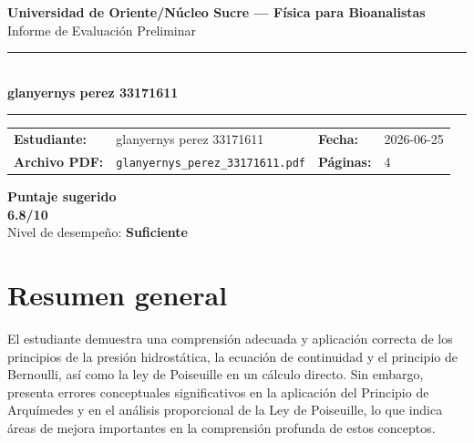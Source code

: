 \documentclass[11pt,a4paper]{article}
\begin{document}
\begin{center}
  {\Large\bfseries\color{azulTitulo} Universidad de Oriente/Núcleo Sucre --- Física para Bioanalistas}\\[4pt]
  {\large Informe de Evaluación Preliminar}\\[12pt]
  \rule{\linewidth}{1.2pt}\\[6pt]
  {\LARGE\bfseries glanyernys perez 33171611}\\[4pt]
  \rule{\linewidth}{0.6pt}
\end{center}

\vspace{4pt}
\begin{tcolorbox}[cajaTitulo, title=Datos del informe]
\begin{tabular}{@{}llll@{}}
  \textbf{Estudiante:}  & glanyernys perez 33171611  &
  \textbf{Fecha:}       & 2026-06-25 \\[4pt]
  \textbf{Archivo PDF:} & \texttt{glanyernys\_perez\_33171611.pdf}  &
  \textbf{Páginas:}     & 4 \\
\end{tabular}
\end{tcolorbox}

\vspace{6pt}
\begin{center}
  \begin{tcolorbox}[
    enhanced,
    colback=white, colframe=desempeno_suficiente,
    width=0.62\linewidth,
    boxrule=2pt,
    halign=center, valign=center,
    top=8pt, bottom=8pt,
  ]
    \centering
    {\large\bfseries Puntaje sugerido}\\[6pt]
    {\Huge\bfseries\color{desempeno_suficiente} 6.8/10}\\[6pt]
    {\large Nivel de desempeño: \textbf{\color{desempeno_suficiente} Suficiente}}
  \end{tcolorbox}
\end{center}

\section*{Resumen general}
El estudiante demuestra una comprensión adecuada y aplicación correcta de los principios de la presión hidrostática, la ecuación de continuidad y el principio de Bernoulli, así como la ley de Poiseuille en un cálculo directo. Sin embargo, presenta errores conceptuales significativos en la aplicación del Principio de Arquímedes y en el análisis proporcional de la Ley de Poiseuille, lo que indica áreas de mejora importantes en la comprensión profunda de estos conceptos.
\end{document}
